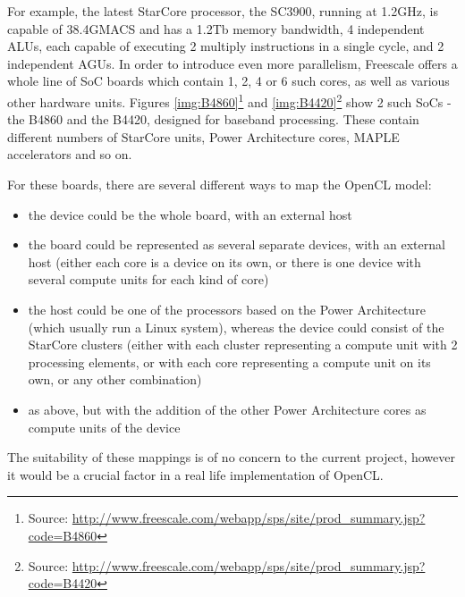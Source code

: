 For example, the latest StarCore processor, the SC3900, running at 1.2GHz, is capable of 38.4GMACS and has a 1.2Tb memory bandwidth, 4 independent ALUs, each capable of executing 2 multiply instructions in a single cycle, and 2 independent AGUs\cite{sc3900}. In order to introduce even more parallelism, Freescale offers a whole line of SoC boards which contain 1, 2, 4 or 6 such cores, as well as various other hardware units. Figures \ref{img:B4860}\footnote{Source: \url{http://www.freescale.com/webapp/sps/site/prod\_summary.jsp?code=B4860}} and \ref{img:B4420}\footnote{Source: \url{http://www.freescale.com/webapp/sps/site/prod\_summary.jsp?code=B4420}} show 2 such SoCs - the B4860 and the B4420, designed for baseband processing. These contain different numbers of StarCore units, Power Architecture cores, MAPLE accelerators and so on.

For these boards, there are several different ways to map the OpenCL model: 
\begin{itemize}
\item the device could be the whole board, with an external host
\item the board could be represented as several separate devices, with an external host (either each core is a device on its own, or there is one device with several compute units for each kind of core)
\item the host could be one of the processors based on the Power Architecture (which usually run a Linux system), whereas the device could consist of the StarCore clusters (either with each cluster representing a compute unit with 2 processing elements, or with each core representing a compute unit on its own, or any other combination)
\item as above, but with the addition of the other Power Architecture cores as compute units of the device
\end{itemize}
The suitability of these mappings is of no concern to the current project, however it would be a crucial factor in a real life implementation of OpenCL.